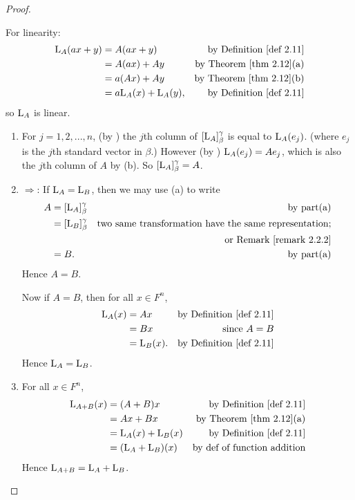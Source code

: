 \begin{proof} \ 

For linearity:
\begin{align*}
    \LMTRAN_A(ax + y) & = A(ax + y) & \text{by \DEF{2.11}} \\
                      & = A(ax) + Ay & \text{by \THM{2.12}(a)} \\
                      & = a(Ax) + Ay & \text{by \THM{2.12}(b)} \\
                      & = a\LMTRAN_A(x) + \LMTRAN_A(y), & \text{by \DEF{2.11}}
\end{align*}
so \(\mathrm{L}_A\) is linear.

\begin{enumerate}
\item
For \(j = 1, 2, ..., n\), (by ) the \(j\)th column of \([\mathrm{L}_A]_{\beta}^{\gamma}\) is equal to \(\mathrm{L}_A(e_j)\). (where \(e_j\) is the \(j\)th standard vector in \(\beta\).)
However (by ) \(\mathrm{L}_A(e_j) = A e_j\), which is also the \(j\)th column of \(A\) by (b).
So \([\mathrm{L}_A]_{\beta}^{\gamma} = A\).

\item
\(\Longrightarrow\):
If \(\mathrm{L}_A = \mathrm{L}_B\), then we may use (a) to write
\begin{align*}
    A & = [\LMTRAN_A]_{\beta}^{\gamma} & \text{by part(a)} \\
      & = [\LMTRAN_B]_{\beta}^{\gamma} & \text{two same transformation have the same representation;} \\
      & & \text{or \RMK{2.2.2}} \\
      & = B. & \text{by part(a)}
\end{align*}
Hence \(A = B\).

Now if \(A = B\), then for all \(x \in F^n\),
\begin{align*}
    \LMTRAN_A(x) & = Ax & \text{by \DEF{2.11}} \\
                 & = Bx & \text{since \(A = B\)} \\
                 & = \LMTRAN_B(x). & \text{by \DEF{2.11}}
\end{align*}
Hence \(\mathrm{L}_A = \mathrm{L}_B\).

\item For all \(x \in F^n\),
\begin{align*}
    \LMTRAN_{A + B}(x) & = (A + B)x & \text{by \DEF{2.11}} \\
                       & = Ax + Bx & \text{by \THM{2.12}(a)} \\
                       & = \LMTRAN_A(x) + \LMTRAN_B(x) & \text{by \DEF{2.11}} \\
                       & = (\LMTRAN_A + \LMTRAN_B)(x) & \text{by def of function addition}
\end{align*}
Hence \(\mathrm{L}_{A + B} = \mathrm{L}_A + \mathrm{L}_B\).


\end{enumerate}
\end{proof}
